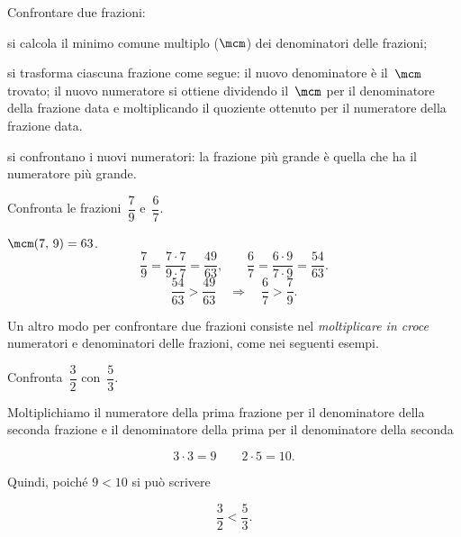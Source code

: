 \begin{procedura}
	Confrontare due frazioni:
\begin{enumeratea}
\item si calcola il minimo comune multiplo ($\mcm$) dei denominatori delle frazioni;
\item si trasforma ciascuna frazione come segue:
\subitem il nuovo denominatore è il~$\mcm$ trovato;
\subitem il nuovo numeratore si ottiene dividendo il~$\mcm$ per il denominatore della
	  frazione data e moltiplicando il quoziente ottenuto per il numeratore della frazione data.
\item si confrontano i nuovi numeratori: la frazione più grande è quella che ha il numeratore più
	grande.
\end{enumeratea}
\end{procedura}
\begin{exrig}
\begin{esempio}
Confronta le frazioni~$\dfrac{7}{9}$ e~$\dfrac{6}{7}$.

$\mcm(7\text{,~}9)=63$.
\[\frac{7}{9}=\frac{7\cdot7}{9\cdot7}=\frac{49}{63}\text{,}\qquad%
\frac{6}{7}=\frac{6\cdot9}{7\cdot9}=\frac{54}{63}.\]
\[\frac{54}{63}>\frac{49}{63}\quad\Rightarrow\quad\frac{6}{7}>\frac{7}{9}.\]
\end{esempio}
\end{exrig}

Un altro modo per confrontare due frazioni consiste nel \emph{moltiplicare in croce} numeratori e
denominatori delle frazioni, come nei seguenti esempi.

\pagebreak
\begin{exrig}
\begin{esempio}
Confronta~$\dfrac{3}{2}$ con~$\dfrac{5}{3}$.

Moltiplichiamo il numeratore della prima frazione per il denominatore della seconda frazione e
il denominatore della prima per il denominatore della seconda

 \[3\cdot3=9 \qquad 2\cdot5=10.\]

Quindi, poiché $9<10$ si può scrivere

 \[\dfrac{3}{2}<\dfrac{5}{3}.\]

\end{esempio}
\end{exrig}

\ovalbox{\risolvii \ref{ese:3.36}, \ref{ese:3.37}, \ref{ese:3.38}, \ref{ese:3.39}, \ref{ese:3.40}, \ref{ese:3.41}, \ref{ese:3.42}, \ref{ese:3.43}, \ref{ese:3.44}}

